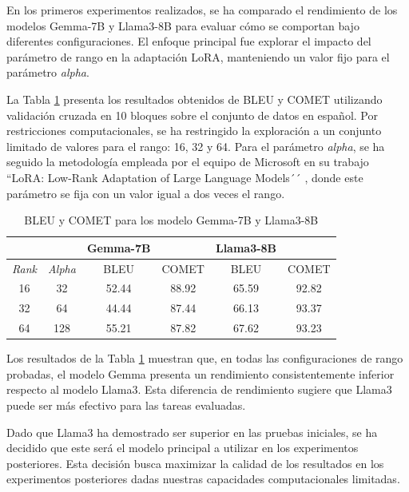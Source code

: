 \documentclass[11pt,spanish,listoffigures,listoftables]{tfgetsinf}
\begin{document}
En los primeros experimentos realizados, se ha comparado el rendimiento de los modelos Gemma-7B y Llama3-8B para evaluar cómo se comportan bajo diferentes configuraciones. El enfoque principal fue explorar el impacto del parámetro de rango en la adaptación LoRA, manteniendo un valor fijo para el parámetro \textit{alpha}.

La Tabla \ref{tab: Gemma y Llama} presenta los resultados obtenidos de BLEU y COMET utilizando validación cruzada en 10 bloques sobre el conjunto de datos en español. Por restricciones computacionales, se ha restringido la exploración a un conjunto limitado de valores para el rango: 16, 32 y 64. Para el parámetro \textit{alpha}, se ha seguido la metodología empleada por el equipo de Microsoft en su trabajo ``LoRA: Low-Rank Adaptation of Large Language Models´´  \cite{hu2021loralowrankadaptationlarge}, donde este parámetro se fija con un valor igual a dos veces el rango.

\begin{table}[!h]
\caption{BLEU y COMET para los modelo Gemma-7B y Llama3-8B}
\begin{center}
\begin{tabular}{ c c c c c c }
	\ & \ & Gemma-7B & \ & Llama3-8B & \ \\
	\hline
	\textit{Rank} & \textit{Alpha} & BLEU & COMET & BLEU & COMET \\
	\hline
	\hline
	16 & 32 & 52.44 & 88.92 & 65.59 & 92.82 \\
	\hline
	32 & 64 & 44.44 & 87.44 & 66.13 & 93.37 \\
	\hline
	64 & 128 & 55.21 & 87.82 & 67.62 & 93.23 \\
	

\end{tabular}
\end{center}
\label{tab: Gemma y Llama}
\end{table}

Los resultados de la Tabla \ref{tab: Gemma y Llama} muestran que, en todas las configuraciones de rango probadas, el modelo Gemma presenta un rendimiento consistentemente inferior respecto al modelo Llama3. Esta diferencia de rendimiento sugiere que Llama3 puede ser más efectivo para las tareas evaluadas.

Dado que Llama3 ha demostrado ser superior en las pruebas iniciales, se ha decidido que este será el modelo principal a utilizar en los experimentos posteriores. Esta decisión busca maximizar la calidad de los resultados en los experimentos posteriores dadas nuestras capacidades computacionales limitadas.
\end{document}
